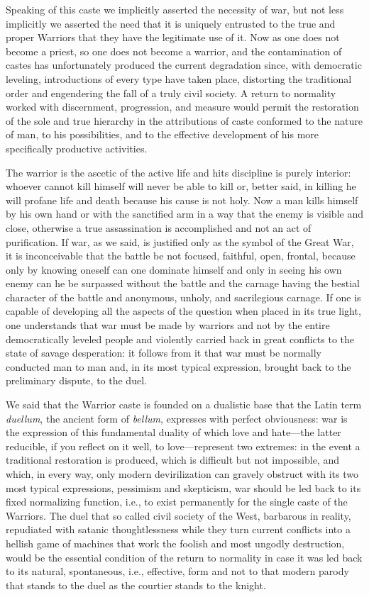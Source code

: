 Speaking of this caste we implicitly asserted the necessity of war, but not less implicitly we asserted the need that it is uniquely entrusted to the true and proper Warriors that they have the legitimate use of it. Now as one does not become a priest, so one does not become a warrior, and the contamination of castes has unfortunately produced the current degradation since, with democratic leveling, introductions of every type have taken place, distorting the traditional order and engendering the fall of a truly civil society. A return to normality worked with discernment, progression, and measure would permit the restoration of the sole and true hierarchy in the attributions of caste conformed to the nature of man, to his possibilities, and to the effective development of his more specifically productive activities.

The warrior is the ascetic of the active life and hits discipline is purely interior: whoever cannot kill himself will never be able to kill or, better said, in killing he will profane life and death because his cause is not holy. Now a man kills himself by his own hand or with the sanctified arm in a way that the enemy is visible and close, otherwise a true assassination is accomplished and not an act of purification. If war, as we said, is justified only as the symbol of the Great War, it is inconceivable that the battle be not focused, faithful, open, frontal, because only by knowing oneself can one dominate himself and only in seeing his own enemy can he be surpassed without the battle and the carnage having the bestial character of the battle and anonymous, unholy, and sacrilegious carnage. If one is capable of developing all the aspects of the question when placed in its true light, one understands that war must be made by warriors and not by the entire democratically leveled people and violently carried back in great conflicts to the state of savage desperation: it follows from it that war must be normally conducted man to man and, in its most typical expression, brought back to the preliminary dispute, to the duel.

We said that the Warrior caste is founded on a dualistic base that the Latin term \emph{duellum}, the ancient form of \emph{bellum}, expresses with perfect obviousness: war is the expression of this fundamental duality of which love and hate---the latter reducible, if you reflect on it well, to love---represent two extremes: in the event a traditional restoration is produced, which is difficult but not impossible, and which, in every way, only modern devirilization can gravely obstruct with its two most typical expressions, pessimism and skepticism, war should be led back to its fixed normalizing function, i.e., to exist permanently for the single caste of the Warriors. The duel that so called civil society of the West, barbarous in reality, repudiated with satanic thoughtlessness while they turn current conflicts into a hellish game of machines that work the foolish and most ungodly destruction, would be the essential condition of the return to normality in case it was led back to its natural, spontaneous, i.e., effective, form and not to that modern parody that stands to the duel as the courtier stands to the knight.

